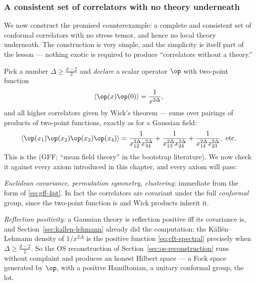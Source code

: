 \subsubsection{A consistent set of correlators with no theory underneath}

We now construct the promised counterexample: a complete and consistent set
of conformal correlators with no stress tensor, and hence no local theory
underneath. The construction is very simple, and the simplicity is itself
part of the lesson --- nothing exotic is required to produce ``correlators
without a theory.''

\begin{eexample}
\label{ex:gff}
Pick a number $\Delta \ge \frac{d-2}{2}$ and \emph{declare} a scalar operator
$\op$ with two-point function
\begin{equation}
\langle \op(x)\op(0)\rangle = \frac{1}{x^{2\Delta}},
\end{equation}
and all higher correlators given by Wick's theorem --- sums over pairings of
products of two-point functions, exactly as for a Gaussian field:
\begin{equation}
\langle \op(x_1)\op(x_2)\op(x_3)\op(x_4)\rangle
= \frac{1}{x_{12}^{2\Delta}x_{34}^{2\Delta}}
+ \frac{1}{x_{13}^{2\Delta}x_{24}^{2\Delta}}
+ \frac{1}{x_{14}^{2\Delta}x_{23}^{2\Delta}}, \text{ etc.}
\label{eq:gff-4pt}
\end{equation}
This is the  (GFF; ``mean field theory'' in
the bootstrap literature). We now check it against every axiom introduced in
this chapter, and every axiom will pass:

\emph{Euclidean covariance, permutation symmetry, clustering:} immediate from
the form of \eqref{eq:gff-4pt}. In fact the correlators are covariant under
the full \emph{conformal} group, since the two-point function is and Wick
products inherit it.

\emph{Reflection positivity:} a Gaussian theory is reflection positive iff its
covariance is, and Section~\ref{sec:kallen-lehmann} already did the
computation: the K\"all\'en--Lehmann density of $1/x^{2\Delta}$ is the
positive function \eqref{eq:cft-spectral} precisely when $\Delta \ge
\frac{d-2}{2}$. So the OS reconstruction of
Section~\ref{sec:os-reconstruction} runs without complaint and produces an
honest Hilbert space --- a Fock space generated by $\op$, with a positive
Hamiltonian, a unitary conformal group, the lot.


\end{eexample}
